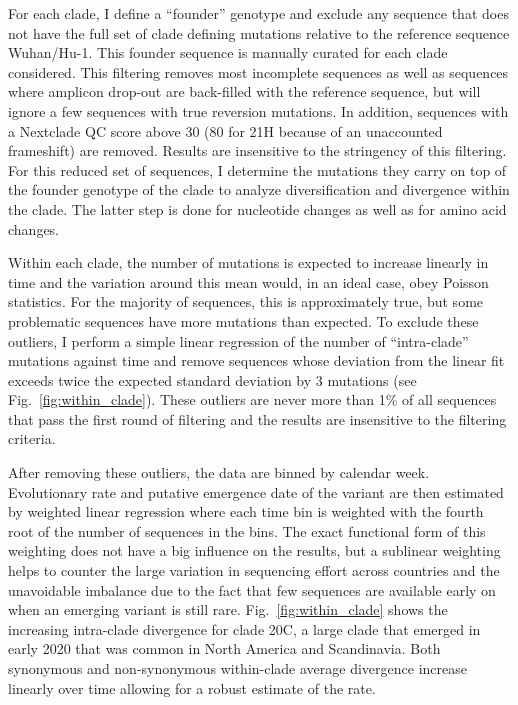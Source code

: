 \documentclass[aps,rmp, twocolumn]{revtex4}
\begin{document}
For each clade, I define a ``founder'' genotype and exclude any sequence that does not have the full set of clade defining mutations relative to the reference sequence Wuhan/Hu-1.
This founder sequence is manually curated for each clade considered.
This filtering removes most incomplete sequences as well as sequences where amplicon drop-out are back-filled with the reference sequence, but will ignore a few sequences with true reversion mutations.
In addition, sequences with a Nextclade QC score above 30 (80 for 21H because of an unaccounted frameshift) are removed.
Results are insensitive to the stringency of this filtering.
For this reduced set of sequences, I determine the mutations they carry on top of the founder genotype of the clade to analyze diversification and divergence within the clade.
The latter step is done for nucleotide changes as well as for amino acid changes.

Within each clade, the number of mutations is expected to increase linearly in time and the variation around this mean would, in an ideal case, obey Poisson statistics.
For the majority of sequences, this is approximately true, but some problematic sequences have more mutations than expected.
To exclude these outliers, I perform a simple linear regression of the number of ``intra-clade'' mutations against time and remove sequences whose deviation from the linear fit exceeds twice the expected standard deviation by 3 mutations (see Fig.~\ref{fig:within_clade}). These outliers are never more than 1\% of all sequences that pass the first round of filtering and the results are insensitive to the filtering criteria.


After removing these outliers, the data are binned by calendar week.
Evolutionary rate and putative emergence date of the variant are then estimated by weighted linear regression where each time bin is weighted with the fourth root of the number of sequences in the bins.
The exact functional form of this weighting does not have a big influence on the results, but a sublinear weighting helps to counter the large variation in sequencing effort across countries and the unavoidable imbalance due to the fact that few sequences are available early on when an emerging variant is still rare.
Fig.~\ref{fig:within_clade} shows the increasing intra-clade divergence for clade 20C, a large clade that emerged in early 2020 that was common in North America and Scandinavia.
Both synonymous and non-synonymous within-clade average divergence increase linearly over time allowing for a robust estimate of the rate.
\end{document}
